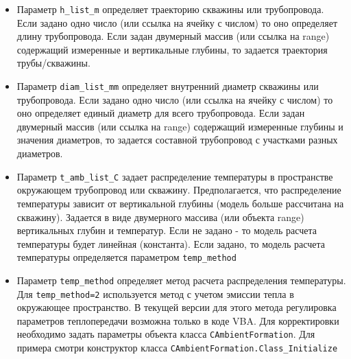 \begin{itemize}
	\item Параметр 	\texttt{h_list_m} определяет траекторию скважины или трубопровода. Если задано одно число (или ссылка на ячейку с числом) то оно определяет длину трубопровода. Если задан двумерный массив (или ссылка на range) содержащий измеренные и вертикальные глубины, то задается траектория трубы/скважины. 
	\item Параметр 	\texttt{diam_list_mm} определяет внутренний диаметр скважины или трубопровода. Если задано одно число (или ссылка на ячейку с числом) то оно определяет единый диаметр для всего трубопровода. Если задан двумерный массив (или ссылка на range) содержащий измеренные глубины и значения диаметров, то задается составной трубопровод с участками разных диаметров. 
	\item Параметр \texttt{t_amb_list_C} задает распределение температуры в пространстве окружающем трубопровод или скважину. Предполагается, что распределение температуры зависит от вертикальной глубины (модель больше рассчитана на скважину). Задается в виде двумерного массива (или объекта range) вертикальных глубин и температур. Если не задано - то модель расчета температуры будет линейная (константа). Если задано, то модель расчета температуры определяется параметром \texttt{temp_method}
	\item Параметр \texttt{temp_method} определяет метод расчета распределения температуры. Для \texttt{temp_method=2} используется метод с учетом эмиссии тепла в окружающее пространство. В текущей версии \unf{} для этого метода регулировка параметров теплопередачи возможна только в коде VBA. Для корректировки необходимо задать параметры объекта класса  \texttt{CAmbientFormation}. Для примера смотри конструктор класса  \texttt{CAmbientFormation.Class_Initialize}
	
\end{itemize}


\newpage

